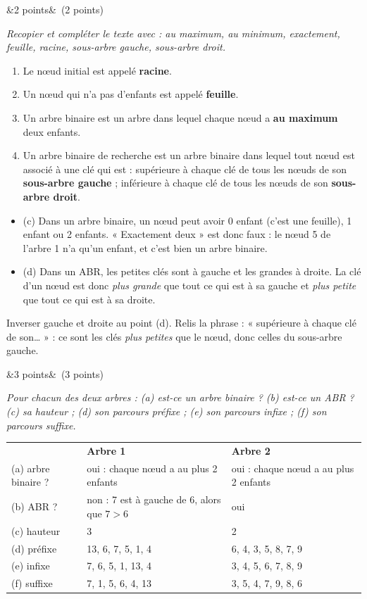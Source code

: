 \documentclass[11pt, a4paper]{exam}
\newcommand{\Q}[3]{\par\needspace{5\baselineskip}\bigskip\noindent{\large\bfseries Question #1}\ifx&#2&\else\ \textnormal{(#2)}\fi\par\nopagebreak\smallskip\noindent\textit{#3}\par\nopagebreak\smallskip}
\begin{document}
\Q{1}{2 points}{Recopier et compléter le texte avec : au maximum, au minimum, exactement, feuille, racine, sous-arbre gauche, sous-arbre droit.}
\begin{reponse}
\begin{enumerate}[label=(\alph*)]
\item Le nœud initial est appelé \textbf{racine}.
\item Un nœud qui n'a pas d'enfants est appelé \textbf{feuille}.
\item Un arbre binaire est un arbre dans lequel chaque nœud a \textbf{au maximum} deux enfants.
\item Un arbre binaire de recherche est un arbre binaire dans lequel tout nœud est associé à une clé qui est :
supérieure à chaque clé de tous les nœuds de son \textbf{sous-arbre gauche} ;
inférieure à chaque clé de tous les nœuds de son \textbf{sous-arbre droit}.
\end{enumerate}
\end{reponse}
\begin{itemize}
\item (c) Dans un arbre binaire, un nœud peut avoir 0 enfant (c'est une feuille), 1 enfant ou 2 enfants. « Exactement deux » est donc faux : le nœud 5 de l'arbre 1 n'a qu'un enfant, et c'est bien un arbre binaire.
\item (d) Dans un ABR, les petites clés sont à gauche et les grandes à droite. La clé d'un nœud est donc \emph{plus grande} que tout ce qui est à sa gauche et \emph{plus petite} que tout ce qui est à sa droite.
\end{itemize}
\begin{erreur}
Inverser gauche et droite au point (d). Relis la phrase : « supérieure à chaque clé de son\ldots{} » : ce sont les clés \emph{plus petites} que le nœud, donc celles du sous-arbre gauche.
\end{erreur}

\Q{2}{3 points}{Pour chacun des deux arbres : (a) est-ce un arbre binaire ? (b) est-ce un ABR ? (c) sa hauteur ; (d) son parcours préfixe ; (e) son parcours infixe ; (f) son parcours suffixe.}
\begin{reponse}
\renewcommand{\arraystretch}{1.25}
\begin{tabular}{@{}p{3.2cm}p{6.2cm}p{5.6cm}@{}}
 & \textbf{Arbre 1} & \textbf{Arbre 2} \\
(a) arbre binaire ? & oui : chaque nœud a au plus 2 enfants & oui : chaque nœud a au plus 2 enfants \\
(b) ABR ? & non : 7 est à gauche de 6, alors que $7 > 6$ & oui \\
(c) hauteur & 3 & 2 \\
(d) préfixe & 13, 6, 7, 5, 1, 4 & 6, 4, 3, 5, 8, 7, 9 \\
(e) infixe & 7, 6, 5, 1, 13, 4 & 3, 4, 5, 6, 7, 8, 9 \\
(f) suffixe & 7, 1, 5, 6, 4, 13 & 3, 5, 4, 7, 9, 8, 6 \\
\end{tabular}
\end{reponse}
\end{document}
